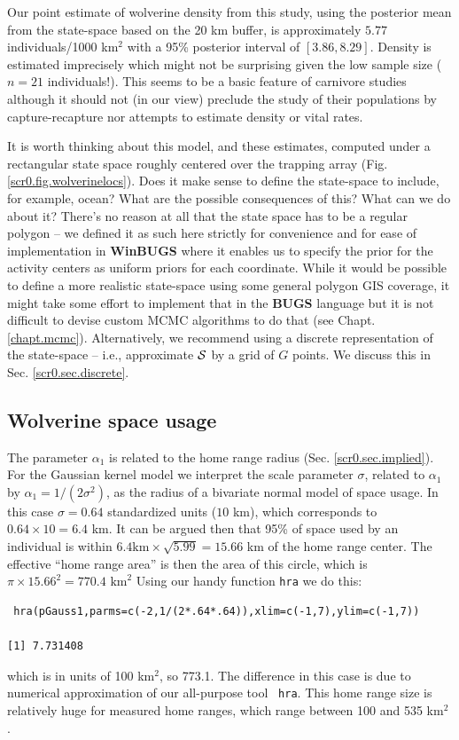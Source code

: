 Our point estimate of wolverine density from this study, using the
posterior mean from the state-space based on the 20 km buffer, is
approximately $5.77$ individuals/1000 km$^2$ with a 95\% posterior
interval of $[3.86, 8.29]$. Density is estimated imprecisely which
might not be surprising given the low sample size ($n=21$
individuals!). This seems to be a basic feature of carnivore studies
although it should not (in our view) preclude the study of their
populations by capture-recapture nor attempts to estimate density or vital rates.


It is worth thinking about this model, and these estimates, computed
under a rectangular state space roughly centered over the trapping
array (Fig. \ref{scr0.fig.wolverinelocs}).  Does it make sense to
define the state-space to include, for example, ocean? What are the
possible consequences of this? What can we do about it?  There's no
reason at all that the state space has to be a regular polygon -- we
defined it as such here strictly for convenience and for ease of
implementation in {\bf WinBUGS} where it enables us to specify the
prior for the activity centers as uniform priors for each coordinate.
While it would be possible to define a more realistic state-space
using some general polygon GIS coverage, it might take some effort to
implement that in the {\bf BUGS} language but it is not difficult to
devise custom MCMC algorithms to do that (see
Chapt. \ref{chapt.mcmc}).  Alternatively, we recommend using a
discrete representation of the state-space -- i.e., approximate ${\cal
  S}$ by a grid of $G$ points. We discuss this in Sec.
\ref{scr0.sec.discrete}.

\subsection{Wolverine space usage}

The parameter $\alpha_{1}$ is related to the home range radius
(Sec. \ref{scr0.sec.implied}).  For the Gaussian kernel model we
interpret the scale parameter $\sigma$, related to $\alpha_1$ by
$\alpha_1 = 1/(2\sigma^2)$, as the radius of a bivariate normal model
of space usage.  In this case $\sigma = 0.64$ standardized units ($10$
km), which corresponds to $0.64 \times 10 = 6.4$ km.  It can be
argued then that 95\% of space used by an individual is within $6.4
\mbox{km} \times \sqrt{5.99} = 15.66$ km of the home range center. The
effective ``home range area'' is then the area of this circle, which is
$\pi \times 15.66^2 = 770.4$ $\mbox{km}^{2}$
Using our handy function \mbox{\tt hra} we do this:
\begin{verbatim}
 hra(pGauss1,parms=c(-2,1/(2*.64*.64)),xlim=c(-1,7),ylim=c(-1,7))

[1] 7.731408
\end{verbatim}
which is in units of 100 km$^2$, so 773.1. The difference in this case
is due to numerical approximation of our all-purpose tool \mbox{\tt
  hra}. This home range size is
relatively huge for measured home ranges, which range between
100 and 535 km$^2$ \citep{whitman_etal:1986}.

